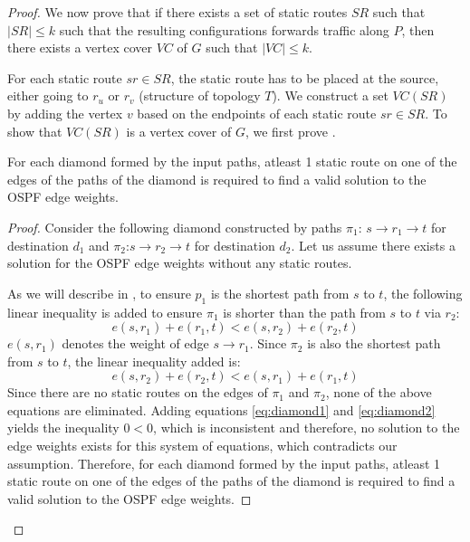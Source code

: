 \begin{proof}
We now prove that if there exists a set of static routes
$SR$ such that $|SR| \leq k$ such that the resulting configurations
forwards traffic along $P$, then there exists a vertex cover $VC$
of $G$ such that $|VC| \leq k$. 

For each static route $sr \in SR$, the static route
has to be placed at the source, either going to $r_u$
or $r_v$ (structure of topology $T$). 
We construct a set $VC(SR)$ by adding the vertex $v$ 
based on the endpoints of each static route $sr \in SR$.
To show that $VC(SR)$ is a vertex cover of $G$, we first
prove .

\begin{lemma} \label{lemma:diamond}
	 For each diamond formed by the input paths, atleast 1 
	 static route on one of the edges of the paths of the diamond 
	 is required to find a valid solution to the
	 OSPF edge weights.  
\end{lemma}

\begin{proof}
Consider the following diamond %
constructed by paths $\pi_1$: $s \rightarrow r_1 \rightarrow t$ 
for destination $d_1$ and $\pi_2$:$s \rightarrow r_2 \rightarrow t$ 
for destination $d_2$. Let us assume there exists a solution 
for the OSPF edge weights without any static routes. 

As we will describe in , 
to ensure $p_1$ is the shortest path from $s$ to $t$, the following
linear inequality is added to ensure $\pi_1$ is shorter than the
path from $s$ to $t$ via $r_2$: 
\begin{equation} \label{eq:diamond1}
	e(s,r_1) + e(r_1, t) < e(s, r_2) + e(r_2,t)
\end{equation}
$e(s,r_1)$ denotes the weight of edge $s \rightarrow r_1$.
Since $\pi_2$ is also the shortest path from $s$ 
to $t$, the linear inequality added is:
\begin{equation}  \label{eq:diamond2}
e(s,r_2) + e(r_2, t) < e(s, r_1) + e(r_1,t)
\end{equation}
Since there are no static routes on the edges
of $\pi_1$ and $\pi_2$, none of the above equations are 
eliminated. 
Adding equations \ref{eq:diamond1} and  \ref{eq:diamond2} 
yields the inequality $0 < 0$, which is inconsistent 
and therefore, no solution to 
the edge weights exists for this system of equations, 
which contradicts our assumption. Therefore,
for each diamond formed by the input paths, atleast 1 
static route on one of the edges of the paths of the diamond 
is required to find a valid solution to the
OSPF edge weights.  
\end{proof}


\end{proof}
